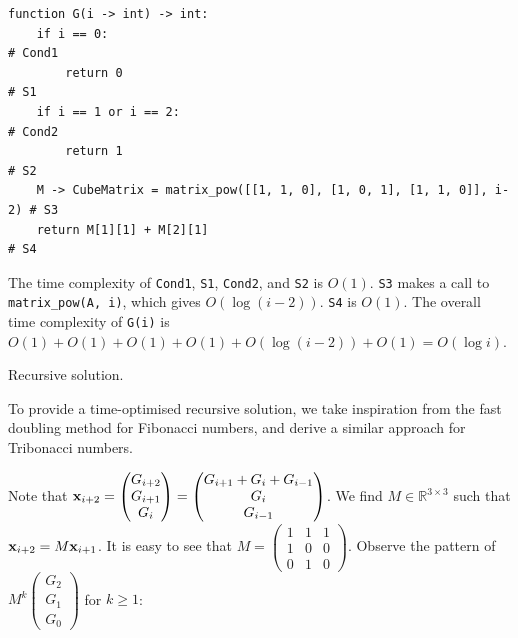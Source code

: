\documentclass[answers]{exam}
\begin{document}
\begin{questions}
\begin{parts}
\begin{subparts}
\begin{solution}
\begin{verbatim}
function G(i -> int) -> int:
    if i == 0:                                                           # Cond1
        return 0                                                         # S1
    if i == 1 or i == 2:                                                 # Cond2
        return 1                                                         # S2
    M -> CubeMatrix = matrix_pow([[1, 1, 0], [1, 0, 1], [1, 1, 0]], i-2) # S3
    return M[1][1] + M[2][1]                                             # S4

                \end{verbatim}

                The time complexity of \texttt{Cond1}, \texttt{S1}, \texttt{Cond2}, and \texttt{S2} is $O(1)$.
                \texttt{S3} makes a call to \texttt{matrix\_pow(A, i)}, which gives $O(\log(i-2))$.
                \texttt{S4} is $O(1)$.
                The overall time complexity of \texttt{G(i)} is $O(1)+O(1)+O(1)+O(1)+O(\log(i-2))+O(1)=O(\log i)$.
            \end{solution}\pagebreak

            \subpart Recursive solution.
            \begin{solution}
                To provide a time-optimised recursive solution, we take inspiration from the fast doubling method for Fibonacci numbers, and derive a similar approach for Tribonacci numbers.

                Note that $\bm{\mathrm{x}}_{i+2}=\begin{pmatrix}G_{i+2}\\G_{i+1}\\G_i\end{pmatrix}=\begin{pmatrix}G_{i+1}+G_i+G_{i-1}\\G_i\\G_{i-1}\end{pmatrix}$.
                We find $M\in\mathbb{R}^{3\times 3}$ such that $\bm{\mathrm{x}}_{i+2}=M\bm{\mathrm{x}}_{i+1}$.
                It is easy to see that $M=\begin{pmatrix}1&1&1\\1&0&0\\0&1&0\end{pmatrix}$.
                Observe the pattern of $M^k\begin{pmatrix}G_2\\G_1\\G_0\end{pmatrix}$ for $k\geq 1$:


\end{solution}
\end{subparts}
\end{parts}
\end{questions}
\end{document}
